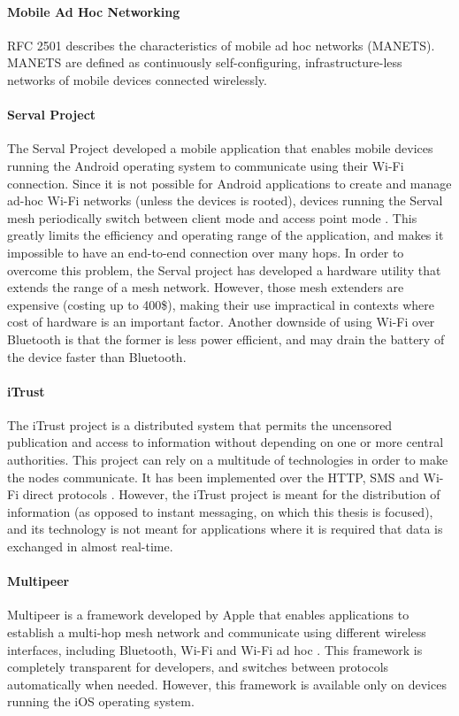 \paragraph{Mobile Ad Hoc Networking} RFC 2501 \cite{rfc2501} describes the characteristics of mobile ad hoc networks (MANETS). MANETS are defined as continuously self-configuring, infrastructure-less networks of mobile devices connected wirelessly.

\paragraph{Serval Project}
The Serval Project developed a mobile application that enables mobile devices running the Android operating system to communicate using their Wi-Fi connection.
Since it is not possible for Android applications to create and manage ad-hoc Wi-Fi networks (unless the devices is rooted), devices running the Serval mesh periodically switch between client mode and access point mode \cite{serval_multi_modal}.
This greatly limits the efficiency and operating range of the application, and makes it impossible to have an  end-to-end connection over many hops.
In order to overcome this problem, the Serval project has developed a hardware utility that extends the range of a mesh network.
However, those mesh extenders are expensive (costing up to 400\$), making their use impractical in contexts where cost of hardware is an important factor.
Another downside of using Wi-Fi over Bluetooth is that the former is less power efficient, and may drain the battery of the device faster than Bluetooth.

\paragraph{iTrust}
The iTrust project \cite{iTrust} is a distributed system that permits the uncensored publication and access to information without depending on one or more central authorities.
This project can rely on a multitude of technologies in order to make the nodes communicate.
It has been implemented over the HTTP, SMS and Wi-Fi direct protocols \cite{iTrust_http}.
However, the iTrust project is meant for the distribution of information (as opposed to instant messaging, on which this thesis is focused), and its technology is not meant for applications where it is required that data is exchanged in almost real-time.

\paragraph{Multipeer}
Multipeer is a framework developed by Apple that enables applications to establish a multi-hop mesh network and communicate using different wireless interfaces, including Bluetooth, Wi-Fi and Wi-Fi ad hoc \cite{multipeer}.
This framework is completely transparent for developers, and switches between protocols automatically when needed.
However, this framework is available only on devices running the iOS operating system.

